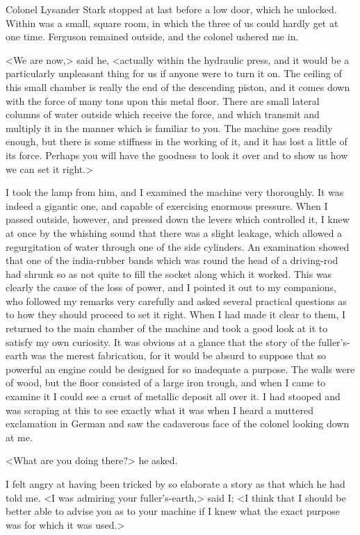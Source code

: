 Colonel Lysander Stark stopped at last before a low door, which he unlocked. Within was a small, square room, in which the three of us could hardly get at one time. Ferguson remained outside, and the colonel ushered me in.

<We are now,> said he, <actually within the hydraulic press, and it would be a particularly unpleasant thing for us if anyone were to turn it on. The ceiling of this small chamber is really the end of the descending piston, and it comes down with the force of many tons upon this metal floor. There are small lateral columns of water outside which receive the force, and which transmit and multiply it in the manner which is familiar to you. The machine goes readily enough, but there is some stiffness in the working of it, and it has lost a little of its force. Perhaps you will have the goodness to look it over and to show us how we can set it right.>

I took the lamp from him, and I examined the machine very thoroughly. It was indeed a gigantic one, and capable of exercising enormous pressure. When I passed outside, however, and pressed down the levers which controlled it, I knew at once by the whishing sound that there was a slight leakage, which allowed a regurgitation of water through one of the side cylinders. An examination showed that one of the india-rubber bands which was round the head of a driving-rod had shrunk so as not quite to fill the socket along which it worked. This was clearly the cause of the loss of power, and I pointed it out to my companions, who followed my remarks very carefully and asked several practical questions as to how they should proceed to set it right. When I had made it clear to them, I returned to the main chamber of the machine and took a good look at it to satisfy my own curiosity. It was obvious at a glance that the story of the fuller's-earth was the merest fabrication, for it would be absurd to suppose that so powerful an engine could be designed for so inadequate a purpose. The walls were of wood, but the floor consisted of a large iron trough, and when I came to examine it I could see a crust of metallic deposit all over it. I had stooped and was scraping at this to see exactly what it was when I heard a muttered exclamation in German and saw the cadaverous face of the colonel looking down at me.

<What are you doing there?> he asked.

I felt angry at having been tricked by so elaborate a story as that which he had told me. <I was admiring your fuller's-earth,> said I; <I think that I should be better able to advise you as to your machine if I knew what the exact purpose was for which it was used.>

